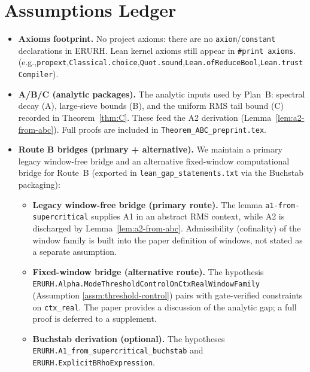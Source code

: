 \section{Assumptions Ledger}
\begin{itemize}
  \item \textbf{Axioms footprint.} No project axioms: there are no \texttt{axiom}/\texttt{constant} declarations in ERURH. Lean kernel axioms still appear in \texttt{\#print axioms}.\\
  (e.g.,\allowbreak \texttt{propext},\allowbreak \texttt{Classical.choice},\allowbreak \texttt{Quot.sound},\allowbreak \texttt{Lean.ofReduceBool},\allowbreak \texttt{Lean.trustCompiler}).
  \item \textbf{A/B/C (analytic packages).} The analytic inputs used by Plan~B:
  spectral decay (A), large-sieve bounds (B), and the uniform RMS tail bound (C)
  recorded in Theorem~\ref{thm:C}. These feed the A2 derivation
  (Lemma~\ref{lem:a2-from-abc}). Full proofs are included in
  \texttt{Theorem\_ABC\_preprint.tex}.
  \item \textbf{Route B bridges (primary + alternative).} We maintain a primary
  legacy window-free bridge and an alternative fixed-window computational bridge
  for Route~B (exported in \texttt{lean\_gap\_statements.txt} via the Buchstab
  packaging):
  \begin{itemize}
    \item \textbf{Legacy window-free bridge (primary route).} The lemma
    \texttt{a1-from-supercritical} supplies A1 in an abstract RMS context, while
    A2 is discharged by Lemma~\ref{lem:a2-from-abc}. Admissibility (cofinality)
    of the window family is built into the paper definition of windows, not
    stated as a separate assumption.
    \item \textbf{Fixed-window bridge (alternative route).} The hypothesis\\
    \texttt{ERURH.Alpha.ModeThresholdControl}\allowbreak\texttt{OnCtxRealWindowFamily}\\
    (Assumption
    \ref{assm:threshold-control}) pairs with gate-verified constraints on
    \texttt{ctx\_real}. The paper provides a discussion of the analytic gap;
    a full proof is deferred to a supplement.
    \item \textbf{Buchstab derivation (optional).} The hypotheses\\
    \texttt{ERURH.A1\_from\_supercritical}\allowbreak\texttt{\_buchstab} and\\
    \texttt{ERURH.ExplicitBRhoExpression}.\\

\end{itemize}
\end{itemize}
